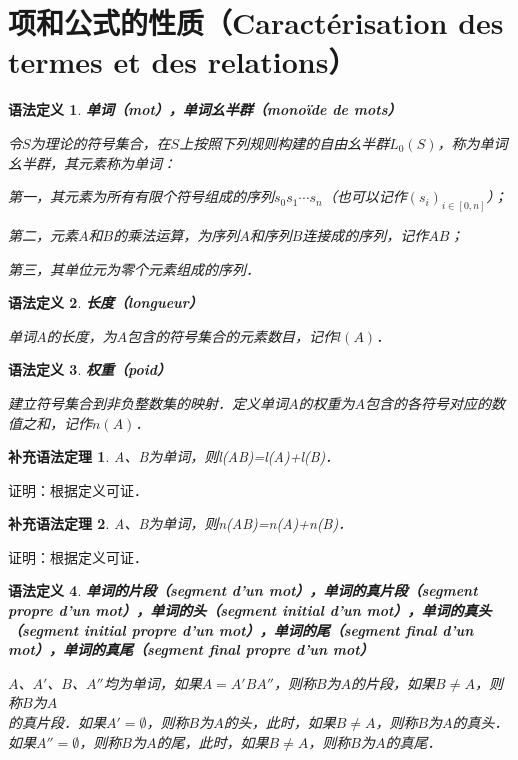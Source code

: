 \documentclass[12pt, a4paper, oneside]{book}
\newtheorem{gramdef}{语法定义}
\newtheorem{gramcor}{补充语法定理}
\begin{document}
		\section{项和公式的性质（Caractérisation des termes et des relations）}
			\begin{gramdef}
				\textbf{单词（mot），单词幺半群（monoïde de mots）}
				\par
				令$S$为理论的符号集合，在$S$上按照下列规则构建的自由幺半群$L_0(S)$，称为单词幺半群，其元素称为单词：
				\par
				第一，其元素为所有有限个符号组成的序列$s_0s_1\cdots s_n$（也可以记作$(s_i)_{i \in [0, n]}$）；
				\par
				第二，元素$A$和$B$的乘法运算，为序列$A$和序列$B$连接成的序列，记作$AB$；
				\par
				第三，其单位元为零个元素组成的序列．
			\end{gramdef}

			\begin{gramdef}
				\textbf{长度（longueur）}
				\par
				单词$A$的长度，为$A$包含的符号集合的元素数目，记作$l(A)$．
			\end{gramdef}

			\begin{gramdef}
				\textbf{权重（poid）}
				\par				
				建立符号集合到非负整数集的映射．定义单词$A$的权重为$A$包含的各符号对应的数值之和，记作$n(A)$．
			\end{gramdef}
	
			\begin{gramcor}\label{gramcor1}
				A、B为单词，则l(AB)=l(A)+l(B)．
			\end{gramcor}
			证明：根据定义可证．
			
			\begin{gramcor}\label{gramcor2}
				A、B为单词，则n(AB)=n(A)+n(B)．
			\end{gramcor}
			证明：根据定义可证．
			
			\begin{gramdef}
				\textbf{单词的片段（segment d'un mot），单词的真片段（segment propre d'un mot），单词的头（segment initial d'un mot），单词的真头（segment initial propre d'un mot），单词的尾（segment final d'un mot），单词的真尾（segment final propre d'un mot）}
				\par
				$A$、$A'$、$B$、$A''$均为单词，如果$A=A'BA''$，则称$B$为$A$的片段，如果$B\neq A$，则称$B$为$A$\\的真片段．如果$A'=\emptyset$，则称$B$为$A$的头，此时，如果$B\neq A$，则称$B$为$A$的真头．如果$A''=\emptyset$，则称$B$为$A$的尾，此时，如果$B\neq A$，则称$B$为$A$的真尾．	
			\end{gramdef}			
			
\end{document}
